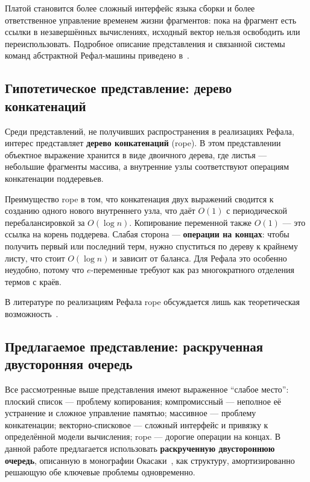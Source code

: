 \documentclass[14pt, russian]{scrartcl}
\newcommand{\enq}[1]{\enquote{#1}}
\begin{document}
Платой становится более сложный интерфейс языка сборки и более
ответственное управление временем жизни фрагментов: пока на фрагмент есть
ссылки в незавершённых вычислениях, исходный вектор нельзя освободить или
переиспользовать. Подробное описание представления и связанной системы
команд абстрактной Рефал-машины приведено в~\cite{skorobogatov_repr}.

\subsection{Гипотетическое представление: дерево конкатенаций}
\label{sec:rope-repr}

Среди представлений, не получивших распространения в реализациях Рефала,
интерес представляет \textbf{дерево конкатенаций} (rope). В этом
представлении объектное выражение хранится в виде двоичного дерева, где
листья --- небольшие фрагменты массива, а внутренние узлы соответствуют
операциям конкатенации поддеревьев.

Преимущество rope в том, что конкатенация двух выражений сводится к
созданию одного нового внутреннего узла, что даёт \(O(1)\) с периодической
перебалансировкой за \(O(\log n)\). Копирование переменной также \(O(1)\)
--- это ссылка на корень поддерева. Слабая сторона --- \textbf{операции на
концах}: чтобы получить первый или последний терм, нужно спуститься по
дереву к крайнему листу, что стоит \(O(\log n)\) и зависит от баланса.
Для Рефала это особенно неудобно, потому что \(e\)-переменные требуют как
раз многократного отделения термов с краёв.

В литературе по реализациям Рефала rope обсуждается лишь как теоретическая
возможность~\cite{refal05_site}.

\subsection{Предлагаемое представление: раскрученная двусторонняя очередь}
\label{sec:bootstrapped-deque}

Все рассмотренные выше представления имеют выраженное \enq{слабое место}:
плоский список --- проблему копирования; компромиссный --- неполное её
устранение и сложное управление памятью; массивное --- проблему
конкатенации; векторно-списковое --- сложный интерфейс и привязку к
определённой модели вычисления; rope --- дорогие операции на концах. В
данной работе предлагается использовать \textbf{раскрученную двустороннюю
очередь}, описанную в монографии
Окасаки~\cite{okasaki_pfds}, как структуру, амортизированно решающую обе
ключевые проблемы одновременно.
\end{document}
